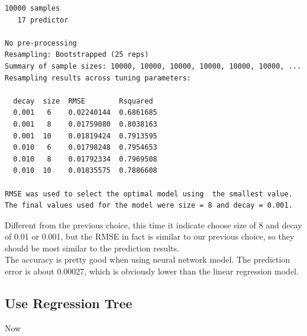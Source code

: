 \documentclass{article}%
\begin{document}
\begin{verbatim}
10000 samples
   17 predictor

No pre-processing
Resampling: Bootstrapped (25 reps) 
Summary of sample sizes: 10000, 10000, 10000, 10000, 10000, 10000, ... 
Resampling results across tuning parameters:

  decay  size  RMSE        Rsquared 
  0.001   6    0.02240144  0.6861685
  0.001   8    0.01759080  0.8038163
  0.001  10    0.01819424  0.7913595
  0.010   6    0.01798248  0.7954653
  0.010   8    0.01792334  0.7969508
  0.010  10    0.01835575  0.7886608

RMSE was used to select the optimal model using  the smallest value.
The final values used for the model were size = 8 and decay = 0.001. 
\end{verbatim}

\indent Different from the previous choice, this time it indicate choose size of 8 and decay of 0.01 or 0.001, but the RMSE in fact is similar to our previous choice, so they should be most similar to the prediction results.\\
\indent The accuracy is pretty good when using neural network model. The prediction error is about 0.00027, which is obviously lower than the linear regression model.

\subsection{Use Regression Tree}
Now
\end{document}
